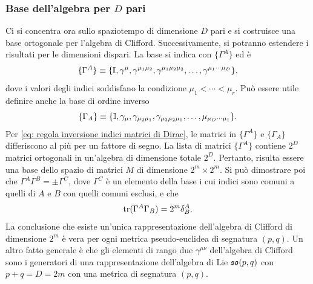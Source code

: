 \subsubsection{Base dell'algebra per \texorpdfstring{$D$}{D} pari}
Ci si concentra ora sullo spaziotempo di dimensione $D$ pari e si costruisce una base ortogonale per l'algebra di Clifford. Successivamente, si potranno estendere i risultati per le dimensioni dispari. La base si indica con $\{\Gamma^A\}$ ed è
\begin{equation}
    \{\Gamma^A\} \equiv \{\mathbb{I},\gamma^\mu,\gamma^{\mu_1\mu_2},\gamma^{\mu_1\mu_2\mu_3},\dots,\gamma^{\mu_1\cdots\mu_D}\},
\end{equation}
dove i valori degli indici soddisfano la condizione $\mu_1 < \cdots < \mu_r$. Può essere utile definire anche la base di ordine inverso 
\begin{equation}
    \{\Gamma_A\} \equiv \{\mathbb{I},\gamma_\mu,\gamma_{\mu_2\mu_1},\gamma_{\mu_3\mu_2\mu_1},\dots,\mu_{\mu_D\cdots\mu_1}\}.
\end{equation}
Per \eqref{eq: regola inversione indici matrici di Dirac}, le matrici in $\{\Gamma^A\}$ e $\{\Gamma_A\}$ differiscono al più per un fattore di segno. La lista di matrici $\{\Gamma^A\}$ contiene $2^D$ matrici ortogonali in un'algebra di dimensione totale $2^D$. Pertanto, risulta essere una base dello spazio di matrici $M$ di dimensione $2^m \times 2^m$. Si può dimostrare poi che $\Gamma^A\Gamma^B = \pm \Gamma^C$, dove $\Gamma^C$ è un elemento della base i cui indici sono comuni a quelli di $A$ e $B$ con quelli comuni esclusi, e che 
\begin{equation}
    \mathrm{tr}{(\Gamma^A\Gamma_B)} = 2^m\delta^A_B.
\end{equation}
La conclusione che esiste un'unica rappresentazione dell'algebra di Clifford di dimensione $2^m$ è vera per ogni metrica pseudo-euclidea di segnatura $(p,q)$. Un altro fatto generale è che gli elementi di rango due $\gamma^{\mu\nu}$ dell'algebra di Clifford sono i generatori di una rappresentazione dell'algebra di Lie $\mathfrak{so}(p, q)$ con $ p + q = D = 2m$ con una metrica di segnatura $(p, q)$. 

